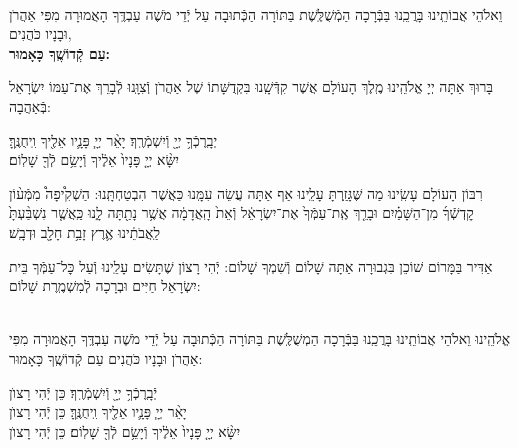 \documentclass[twoside, openany, parskip=half, 11pt]{book}
\begin{document}
\begin{sometimes}


\\
\shatz {}
וֵאלֹהֵי אֲבוֹתֵֽינוּ בָּרֲכֵֽנוּ בַּבְּֿרָכָה הַמְֿשֻׁלֶּֽשֶׁת בַּתּוֹרָה הַכְּֿתוּבָה עַל יְֿדֵי מֹשֶׁה עַבְדֶּֽךָ הָאֲמוּרָה מִפִּי אַהֲרֹן וּבָנָיו כֹּהֲנִים,\\
\textbf{עַם קְֿדוֹשֶֽׁךָ כָּאָמוּר:}

בָּרוּךְ אַתָּה יְיָ אֱלֹהֵֽינוּ מֶֽלֶךְ הָעוֹלָם אֲשֶׁר קִדְּֿשָֽׁנוּ בִּקְדֻשָּׁתוֹ שֶׁל אַהֲרֹן וְֿצִוָּֽנוּ לְֿבָרֵךְ אֶת־עַמּוֹ יִשְׂרָאֵל בְּֿאַהֲבָה:

יְבָֽרֶכְֿךָ֥ יְיָ֖ וְֿיִשְׁמְֿרֶֽךָ׃ \quad יָאֵ֨ר יְיָ֧ פָּנָ֛יו אֵלֶ֖יךָ וִֽיחֻנֶּֽךָּ׃\\ יִשָּׂ֨א יְיָ֤ פָּנָיו֙ אֵלֶ֔יךָ וְֿיָשֵׂ֥ם לְֿךָ֖ שָׁלֽוֹם׃

\nextpage

\begin{paracol}{2}
רִבּוֹן הָעוֹלָם עָשִֽׂינוּ מַה שֶּׁגָּזַֽרְתָּ עָלֵֽינוּ אַף אַתָּה עֲשֵׂה עִמָּֽנוּ כַּאֲשֶׁר הִבְטַחְתָּֽנוּ: הַשְׁקִ֩יפָה֩ מִמְּֿע֨וֹן קׇדְשְֿׁךָ֜ מִן־הַשָּׁמַ֗יִם וּבָרֵ֤ךְ אֶֽת־עַמְּֿךָ֙ אֶת־יִשְׂרָאֵ֔ל וְֿאֵת֙ הָֽאֲדָמָ֔ה אֲשֶׁ֥ר נָתַ֖תָּה לָ֑נוּ כַּֽאֲשֶׁ֤ר נִשְׁבַּ֨עְתָּ֙ לַֽאֲבֹתֵ֔ינוּ אֶ֛רֶץ זָבַ֥ת חָלָ֖ב וּדְבָֽשׁ׃

\switchcolumn

\kahal
אַדִּיר בַּמָּרוֹם שׁוֹכֵן בִּגְבוּרָה אַתָּה שָׁלוֹם וְֿשִׁמְךָ שָׁלוֹם: יְֿהִי רָצוֹן שֶׁתָּשִׂים עָלֵֽינוּ וְֿעַל כׇּל־עַמְּֿךָ בֵּית יִשְׂרָאֵל חַיִּים וּבְרָכָה לְֿמִשְׁמֶֽרֶת שָׁלוֹם:
\end{paracol}

\sepline

\\
 אֱלֹהֵֽינוּ וֵאלֹהֵי אֲבוֹתֵֽינוּ בָּרֲכֵֽנוּ בַּבְּֿרָכָה הַמְשֻׁלֶּֽשֶׁת בַּתּוֹרָה
הַכְּֿתוּבָה עַל יְֿדֵי מֹשֶׁה עַבְדֶּֽךָ הָאֲמוּרָה מִפִּי אַהֲרֹן וּבָנָיו כֹּהֲנִים עַם קְֿדוֹשֶֽׁךָ כָּאָמוּר:

 יְֿבָֽרֶכְֿךָ֥ יְיָ֖ וְֿיִשְׁמְֿרֶֽךָ׃ \hfill \kahal כֵּן יְֿהִי רָצוׂן \\
 יָאֵ֨ר יְיָ֧ פָּנָ֛יו אֵלֶ֖יךָ וִֽיחֻנֶּֽךָּ׃ \hfill \kahal כֵּן יְֿהִי רָצוׂן \\
 יִשָּׂ֨א יְיָ֤ פָּנָיו֙ אֵלֶ֔יךָ וְֿיָשֵׂ֥ם לְֿךָ֖ שָׁלֽוֹם׃ \hfill \kahal כֵּן יְֿהִי רָצוׂן

\end{sometimes}
\end{document}
